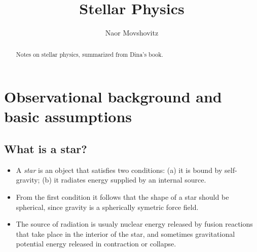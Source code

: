 \documentclass[]{article}
\begin{document}
\title{Stellar Physics}
\author{Naor Movshovitz}
\maketitle

\begin{abstract}
Notes on stellar physics, summarized from Dina's book.
\end{abstract}

\tableofcontents

\section{Observational background and basic assumptions}
\subsection{What is a star?}
\begin{itemize}
\item A \emph{star} is an object that satisfies two conditions: (a) it is
bound by self-gravity; (b) it radiates energy supplied by an internal source.

\item From the first condition it follows that the shape of a star should be
spherical, since gravity is a spherically symetric force field.

\item The source of radiation is usualy nuclear energy released by fusion
reactions that take place in the interior of the star, and sometimes
gravitational potential energy released in contraction or collapse.
\end{itemize}
\end{document}
